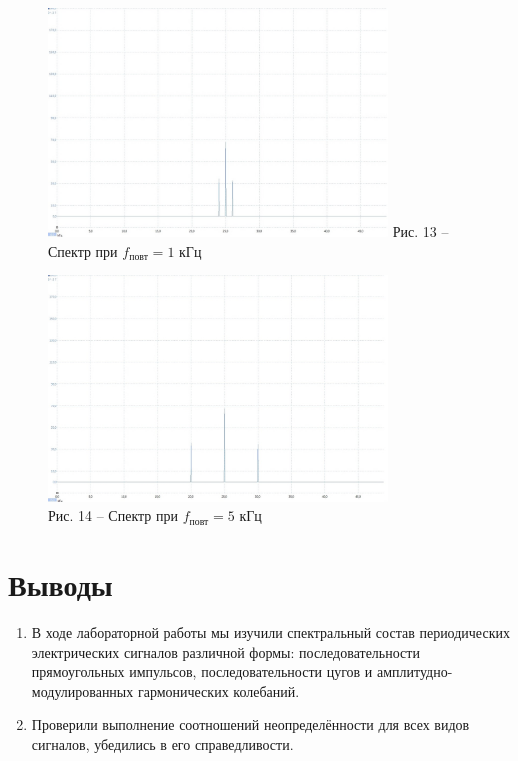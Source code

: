 \documentclass[a4paper,14pt]{article}
\begin{document}
\begin{figure}[!h]
	\parbox[!h]{0.5\textwidth}{\null
		\centering
		\includegraphics[width = 9cm]{1.jpeg}
		Рис. 13 -- Спектр при $f_{\text{повт}} = 1$ кГц}
	\parbox[!h]{0.5\textwidth}{\null
		\centering
		\includegraphics[width = 9cm]{11.jpeg} \\
		Рис. 14 -- Спектр при $f_{\text{повт}} = 5$ кГц}
\end{figure}


\section*{Выводы}
\begin{enumerate}
	\item В ходе лабораторной работы мы изучили спектральный состав периодических электрических сигналов различной формы: последовательности прямоугольных импульсов, последовательности цугов и амплитудно-модулированных гармонических колебаний. 
	\item Проверили выполнение соотношений неопределённости для всех видов сигналов, убедились в его справедливости. 
\end{enumerate}
\end{document}
